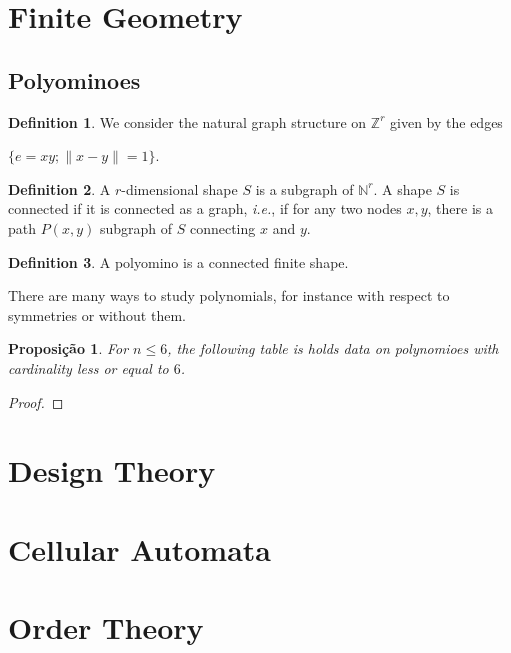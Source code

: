 \documentclass[]{article}
\newtheorem{proposition}{Proposição}[section]
\theoremstyle{definition}
\newtheorem{definition}{Definition}[section]
\theoremstyle{definition}
\newcommand{\ie}{\textit{i.e.}}
\newcommand{\bb}{\mathbb}
\begin{document}
\section{Finite Geometry}

\subsection{Polyominoes}

\begin{definition}
	We consider the natural graph structure on $\bb{Z}^r$ given by the edges 
	
	\begin{center}
		$\{e=xy; \|x-y\|=1 \}$.
	\end{center}
\end{definition}

\begin{definition}
	A $r$-dimensional shape $S$ is a subgraph of $\bb{N}^r$. A shape $S$ is connected if it is connected as a graph, \ie, if for any two nodes $x, y$, there is a path $P(x, y)$ subgraph of $S$ connecting $x$ and $y$. 
\end{definition}

\begin{definition}
	A polyomino is a connected finite shape.
\end{definition}

There are many ways to study polynomials, for instance with respect to symmetries or without them.

\begin{proposition}
	For $n \leq 6$, the following table is holds data on polynomioes with cardinality less or equal to $6$. 



\end{proposition}

\begin{proof}
	
\end{proof}




\section{Design Theory}
\section{Cellular Automata}


\section{Order Theory}
\end{document}
